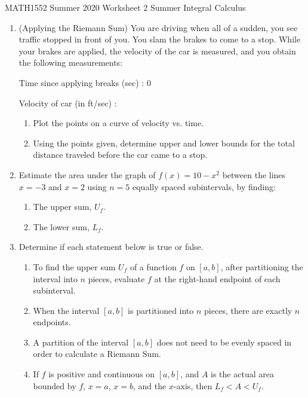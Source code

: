 \documentclass[12pt]{article}
\begin{document}
\noindent
MATH1552 Summer 2020
\hspace{2.2cm}
Worksheet 2 Summer
\hspace{2cm} Integral Calculus

\vspace{2mm}


\begin{enumerate}
    \item (Applying the Riemann Sum) You are driving when all of a sudden, you see traffic
stopped in front of you. You slam the brakes to come to a stop. While your brakes are
applied, the velocity of the car is measured, and you obtain the following measurements:

Time since applying breaks (sec) : 0     

Velocity of car (in ft/sec) :\quad \quad  {}     

    \begin{enumerate}
        \item Plot the points on a curve of velocity vs. time.

        \item Using the points given, determine upper and lower bounds for the total distance traveled
before the car came to a stop.


    \end{enumerate}

\item Estimate the area under the graph of $f(x) = 10-x^2$ between the lines $x = -3$ and
$x = 2$ using $n = 5$ equally spaced subintervals, by finding:

	\begin{enumerate}
	\item The upper sum, $U_f$.

	\item The lower sum, $L_f$.

	\end{enumerate}

\item Determine if each statement below is true or false.

	\begin{enumerate}
	\item To find the upper sum $U_f$ of a function $f$ on $[a, b]$, after partitioning the interval into
$n$ pieces, evaluate $f$ at the right-hand endpoint of each subinterval.

	\item When the interval $[a, b]$ is partitioned into $n$ pieces, there are exactly $n$ endpoints.

	\item A partition of the interval $[a, b]$ does not need to be evenly spaced in order to calculate
a Riemann Sum.

	\item If $f$ is positive and continuous on $[a, b]$, and $A$ is the actual area bounded by $f$, $x = a$,
$x = b$, and the $x$-axis, then $L_f < A < U_f$.
	\end{enumerate}
\end{enumerate}
\end{document}
